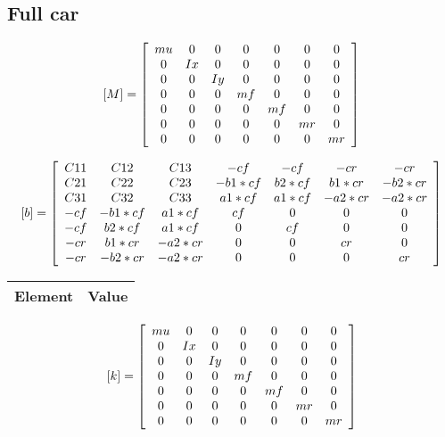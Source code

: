 \subsection{Full car}
\begin{equation*} \label{eq:full_car_m}
	[M] = \left[
		\begin{array}{c c c c c c c}
		mu & 0 & 0 & 0 & 0 & 0 & 0 \\
		0 & Ix & 0 & 0 & 0 & 0 & 0 \\
		0 & 0 & Iy & 0 & 0 & 0 & 0 \\
		0 & 0 & 0 & mf & 0 & 0 & 0 \\
		0 & 0 & 0 & 0 & mf & 0 & 0 \\
		0 & 0 & 0 & 0 & 0 & mr & 0 \\
		0 & 0 & 0 & 0 & 0 & 0 & mr \\
		\end{array}
	\right]
\end{equation*}

\begin{equation*} \label{eq:full_car_b}
	[b] = \left[
		\begin{array}{c c c c c c c}
		C11 & C12 & C13 & -cf & -cf & -cr & -cr \\
		C21 & C22 & C23 & -b1*cf & b2*cf & b1*cr & -b2*cr \\
		C31 & C32 & C33 & a1*cf & a1*cf & -a2*cr & -a2*cr \\
		-cf & -b1*cf & a1*cf & cf & 0 & 0 & 0 \\
		-cf & b2*cf & a1*cf & 0 & cf & 0 & 0 \\
		-cr & b1*cr & -a2*cr & 0 & 0 & cr & 0 \\
		-cr & -b2*cr & -a2*cr & 0 & 0 & 0 & cr \\
		\end{array}
	\right]
\end{equation*}

\begin{center}
\begin{tabular}{| c | l |}
\hline
Element & Value \\
\hline

\hline
\end{tabular}
\end{center}

\begin{equation*} \label{eq:full_car_k}
	[k] = \left[
		\begin{array}{c c c c c c c}
		mu & 0 & 0 & 0 & 0 & 0 & 0 \\
		0 & Ix & 0 & 0 & 0 & 0 & 0 \\
		0 & 0 & Iy & 0 & 0 & 0 & 0 \\
		0 & 0 & 0 & mf & 0 & 0 & 0 \\
		0 & 0 & 0 & 0 & mf & 0 & 0 \\
		0 & 0 & 0 & 0 & 0 & mr & 0 \\
		0 & 0 & 0 & 0 & 0 & 0 & mr \\
		\end{array}
	\right]
\end{equation*}

